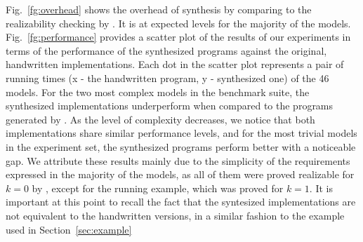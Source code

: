 Fig.~\ref{fg:overhead} shows the overhead of synthesis by \jkindsynt comparing to the realizability checking by \jkind.
It is at expected levels for the majority of the models. %
%
Fig.~\ref{fg:performance} provides a scatter plot of the results of our
experiments in terms of the performance of the synthesized programs against the original, handwritten
implementations. Each dot in the scatter plot represents a pair of
running times (x - the handwritten program, y - synthesized one) of the 46
models.
For the two most complex models in the benchmark
suite, the synthesized implementations underperform when compared to the
programs generated by \lustrev. As the level of complexity decreases, we notice
that both implementations share similar performance levels, and for the most
trivial models in the experiment set, the synthesized programs perform better
with a noticeable gap. We attribute these results mainly due to the
simplicity of the requirements expressed in the majority of the models, as all of
them were proved realizable for $k=0$ by \jkind, except for the running example, which was proved for $k=1$.
It is important at this point to recall the fact that the syntesized
implementations are not equivalent to the handwritten versions, in a similar
fashion to the example used in Section~\ref{sec:example}


